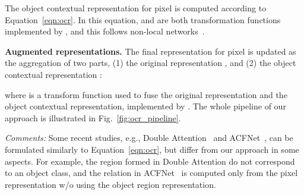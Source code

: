 \documentclass[runningheads]{llncs}
\begin{document}
The object contextual representation  for pixel  
is computed 
according to Equation~\ref{eqn:ocr}.
In this equation, 
 and 
are both transformation functions implemented by
,
and this follows non-local networks~\cite{wang2018non}.


\noindent\textbf{Augmented representations.}
The final representation for pixel  
is updated as the aggregation of two parts,
(1) the original representation ,
and (2) the object contextual representation :

where  is a transform function used to fuse the original representation
and the object contextual representation, implemented by .
The whole pipeline of our approach 
is illustrated in Fig.~\ref{fig:ocr_pipeline}.


\noindent\emph{Comments:}
Some recent studies,
e.g., Double Attention~\cite{A2Net} 
and ACFNet~\cite{Zhang_2019_ICCV},
can be formulated similarly to Equation~\ref{eqn:ocr},
but differ from our approach
in some aspects.
For example, 
the region formed in Double Attention 
do not correspond to an object class,
and the relation in ACFNet~\cite{Zhang_2019_ICCV}
is computed only from the pixel representation
w/o using the object region representation.
\end{document}
